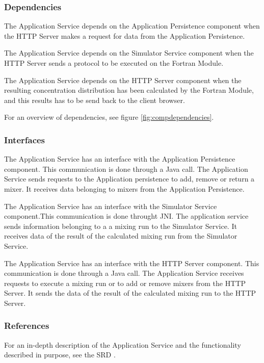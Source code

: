 \subsubsection*{Dependencies}
\begin{description}
\item The Application Service depends on the Application Persistence component when the HTTP Server makes a request for data from the Application Persistence.
\item The Application Service depends on the Simulator Service component when the HTTP Server sends a protocol to be executed on the Fortran Module.
\item The Application Service depends on the HTTP Server component when the resulting concentration distribution has been calculated by the Fortran Module, and this results has to be send back to the client browser.
\end{description}
\noindent For an overview of dependencies, see figure \ref{fig:compdependencies}.

\subsubsection*{Interfaces}
\begin{description}
\item The Application Service has an interface with the Application Persistence component. This communication is done through a Java call. The Application Service sends requests to the Application persistence to add, remove or return a mixer. It receives data belonging to mixers from the Application Persistence.
\item The Application Service has an interface with the Simulator Service component.This communication is done throught JNI. The application service sends information belonging to a a mixing run to the Simulator Service. It receives data of the result of the calculated mixing run from the Simulator Service.
\item The Application Service has an interface with the HTTP Server component. This communication is done through a Java call. The Application Service receives requests to execute a mixing run or to add or remove mixers from the HTTP Server. It sends the data of the result of the calculated mixing run to the HTTP Server.
\end{description}

\subsubsection*{References}
For an in-depth description of the Application Service and the functionality described in purpose, see the SRD \cite{srd}.

